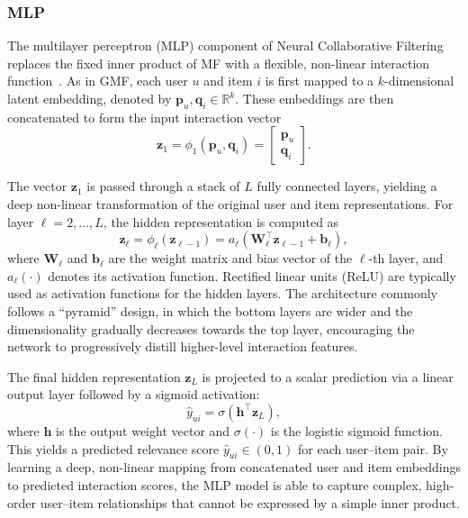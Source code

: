 \documentclass[11pt]{article}
\begin{document}
\subsubsection{MLP}

The multilayer perceptron (MLP) component of Neural Collaborative Filtering replaces the fixed inner product of MF with a flexible, non-linear interaction function~\cite{he2017neural}. As in GMF, each user $u$ and item $i$ is first mapped to a $k$-dimensional latent embedding, denoted by $\mathbf{p}_u, \mathbf{q}_i \in \mathbb{R}^k$. These embeddings are then concatenated to form the input interaction vector
\[
    \mathbf{z}_1 
    = \phi_1\left(\mathbf{p}_u, \mathbf{q}_i\right) 
    = \begin{bmatrix} \mathbf{p}_u \\[2pt] \mathbf{q}_i \end{bmatrix}.
\]

The vector $\mathbf{z}_1$ is passed through a stack of $L$ fully connected layers, yielding a deep non-linear transformation of the original user and item representations. For layer $\ell = 2, \dots, L$, the hidden representation is computed as
\[
    \mathbf{z}_\ell 
    = \phi_\ell\left(\mathbf{z}_{\ell-1}\right)
    = a_\ell\!\left(\mathbf{W}_\ell^\top \mathbf{z}_{\ell-1} + \mathbf{b}_\ell\right),
\]
where $\mathbf{W}_\ell$ and $\mathbf{b}_\ell$ are the weight matrix and bias vector of the $\ell$-th layer, and $a_\ell(\cdot)$ denotes its activation function. Rectified linear units (ReLU) are typically used as activation functions for the hidden layers. The architecture commonly follows a ``pyramid'' design, in which the bottom layers are wider and the dimensionality gradually decreases towards the top layer, encouraging the network to progressively distill higher-level interaction features.

The final hidden representation $\mathbf{z}_L$ is projected to a scalar prediction via a linear output layer followed by a sigmoid activation:
\[
    \hat{y}_{ui} 
    = \sigma\!\left(\mathbf{h}^\top \mathbf{z}_L\right),
\]
where $\mathbf{h}$ is the output weight vector and $\sigma(\cdot)$ is the logistic sigmoid function. This yields a predicted relevance score $\hat{y}_{ui} \in (0,1)$ for each user--item pair. By learning a deep, non-linear mapping from concatenated user and item embeddings to predicted interaction scores, the MLP model is able to capture complex, high-order user--item relationships that cannot be expressed by a simple inner product.
\end{document}
